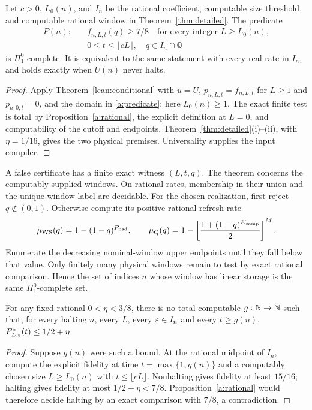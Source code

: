 \begin{theorem}\label{a:complete}
Let \(c>0\), \(L_0(n)\), and \(I_n\) be the rational coefficient,
computable size threshold, and computable rational window in
Theorem~\ref{thm:detailed}. The predicate
\begin{equation}\label{a:predicate}
\begin{split}
 P(n):\quad& f_{n,L,t}(q)\geq 7/8\quad\text{for every integer }L\geq L_0(n),\\
 &0\leq t\leq\lfloor cL\rfloor,
 \quad q\in I_n\cap\mathbb Q
\end{split}
\end{equation}
is \(\Pi^0_1\)-complete. It is equivalent to the same statement with every
real rate in \(I_n\), and holds exactly when \(U(n)\) never halts.
\end{theorem}
\begin{proof}
Apply Theorem~\ref{lean:conditional} with \(u=U\), \(p_{n,L,t}=f_{n,L,t}\) for \(L\ge1\) and \(p_{n,0,t}=0\), and the domain in \eqref{a:predicate}; here \(L_0(n)\ge1\). The exact finite test is total by Proposition~\ref{a:rational}, the
explicit definition at \(L=0\), and computability of the cutoff and endpoints. Theorem~\ref{thm:detailed}(i)--(ii), with \(\eta=1/16\), gives the two physical premises. Universality supplies the input compiler.
\end{proof}

A false certificate has a finite exact witness \((L,t,q)\). The theorem
concerns the computably supplied windows. On rational rates, membership
in their union and the unique window label are decidable. For the chosen
realization, first reject \(q\notin(0,1)\). Otherwise compute its positive
rational refresh rate
\[
 \mu_{\mathrm{WS}}(q)=1-(1-q)^{P_{\rm pad}},\qquad
 \mu_{\mathrm Q}(q)=1-\left[\frac{1+(1-q)^{K_{\rm samp}}}{2}\right]^M.
\]
Enumerate the decreasing nominal-window upper endpoints until they fall
below that value. Only finitely many physical windows remain to test by exact rational
comparison. Hence the set of indices \(n\) whose window has linear
storage is the same \(\Pi^0_1\)-complete set.

\begin{corollary}\label{a:time}
For any fixed rational \(0<\eta<3/8\), there is no total computable
\(g:\mathbb N\to\mathbb N\) such that, for every halting \(n\), every \(L\), every
\(\varepsilon\in I_n\) and every \(t\ge g(n)\), \(F^*_{L,\varepsilon}(t)\le1/2+\eta\).
\end{corollary}
\begin{proof}
Suppose \(g(n)\) were such a bound. At the rational midpoint of \(I_n\),
compute the explicit fidelity at time \(t=\max\{1,g(n)\}\) and a
computably chosen size \(L\geq L_0(n)\) with \(t\leq\lfloor cL\rfloor\).
Nonhalting gives fidelity at least \(15/16\); halting gives fidelity at
most \mbox{\(1/2+\eta<7/8\)}. Proposition~\ref{a:rational} would therefore
decide halting by an exact comparison with \(7/8\), a contradiction.
\end{proof}



